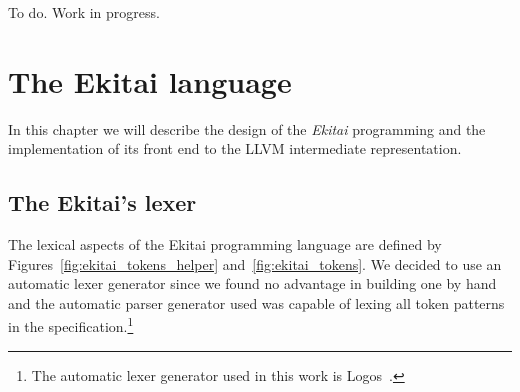 \documentclass[
  oneside,
  english,
  coorientadorbanca,
  noabntexcite
]{ufsc-thesis-rn46-2019}
\begin{document}
To do. Work in progress.

\chapter{The Ekitai language}\label{chapter:proposal}

In this chapter we will describe the design of the \textit{Ekitai} programming and the implementation of its front end to the LLVM intermediate representation.

\section{The Ekitai's lexer}

The lexical aspects of the Ekitai programming language are defined by Figures~\ref{fig:ekitai_tokens_helper} and~\ref{fig:ekitai_tokens}.
We decided to use an automatic lexer generator since we found no advantage in building one by hand and the automatic parser generator used was capable of lexing all token patterns in the specification.\footnote{The automatic lexer generator used in this work is Logos~\cite{logos2020}.}
\end{document}
